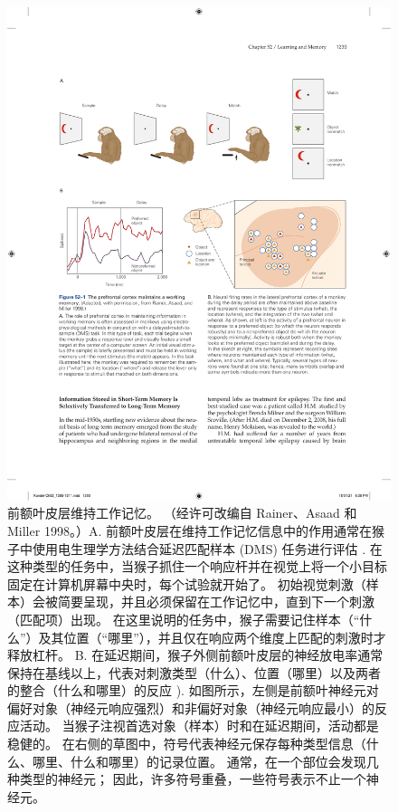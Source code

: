 \begin{figure}[htbp]
	\centering
	\includegraphics[width=0.95\linewidth]{chap52/fig_52_1}
	\caption{前额叶皮层维持工作记忆。 （经许可改编自 Rainer、Asaad 和 Miller 1998。）A. 前额叶皮层在维持工作记忆信息中的作用通常在猴子中使用电生理学方法结合延迟匹配样本 (DMS) 任务进行评估 . 在这种类型的任务中，当猴子抓住一个响应杆并在视觉上将一个小目标固定在计算机屏幕中央时，每个试验就开始了。 初始视觉刺激（样本）会被简要呈现，并且必须保留在工作记忆中，直到下一个刺激（匹配项）出现。 在这里说明的任务中，猴子需要记住样本（“什么”）及其位置（“哪里”），并且仅在响应两个维度上匹配的刺激时才释放杠杆。 B. 在延迟期间，猴子外侧前额叶皮层的神经放电率通常保持在基线以上，代表对刺激类型（什么）、位置（哪里）以及两者的整合（什么和哪里）的反应 ). 如图所示，左侧是前额叶神经元对偏好对象（神经元响应强烈）和非偏好对象（神经元响应最小）的反应活动。 当猴子注视首选对象（样本）时和在延迟期间，活动都是稳健的。 在右侧的草图中，符号代表神经元保存每种类型信息（什么、哪里、什么和哪里）的记录位置。 通常，在一个部位会发现几种类型的神经元； 因此，许多符号重叠，一些符号表示不止一个神经元。}
	\label{fig:52_1}
\end{figure}

